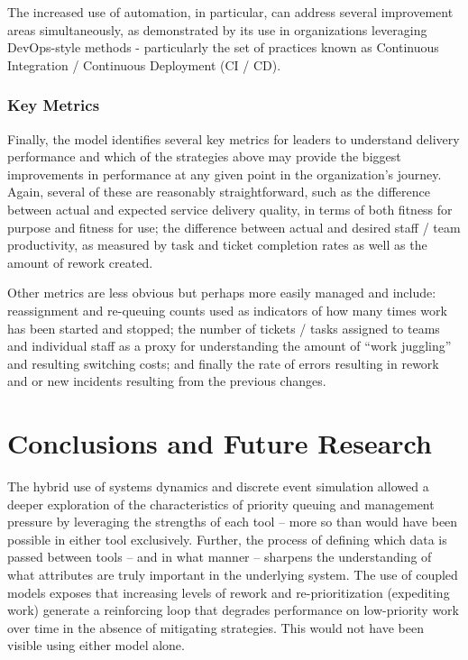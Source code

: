 \documentclass[conference]{IEEEtran}
\begin{document}
The increased use of automation, in particular, can address several improvement areas simultaneously, as demonstrated by its use in organizations leveraging DevOps-style methods - particularly the set of practices known as Continuous Integration / Continuous Deployment (CI / CD). 

\subsubsection{Key Metrics}
\label{sec:key metrics}

Finally, the model identifies several key metrics for leaders to understand delivery performance and which of the strategies above may provide the biggest improvements in performance at any given point in the organization's journey. Again, several of these are reasonably straightforward, such as the difference between actual and expected service delivery quality, in terms of both fitness for purpose and fitness for use; the difference between actual and desired staff / team productivity, as measured by task and ticket completion rates as well as the amount of rework created. 

Other metrics are less obvious but perhaps more easily managed and include: reassignment and re-queuing counts used as indicators of how many times work has been started and stopped; the number of tickets / tasks assigned to teams and individual staff as a proxy for understanding the amount of ``work juggling'' and resulting switching costs; and finally the rate of errors resulting in rework and or new incidents resulting from the previous changes.

\section{Conclusions and Future Research}
\label{sec:futureresearch}

The hybrid use of systems dynamics and discrete event simulation allowed a deeper exploration of the characteristics of priority queuing and management pressure by leveraging the strengths of each tool -- more so than would have been possible in either tool exclusively. Further, the process of defining which data is passed between tools -- and in what manner -- sharpens the understanding of what attributes are truly important in the underlying system. The use of coupled models exposes that increasing levels of rework and re-prioritization (expediting work) generate a reinforcing loop that degrades performance on low-priority work over time in the absence of mitigating strategies. This would not have been visible using either model alone.
\end{document}
